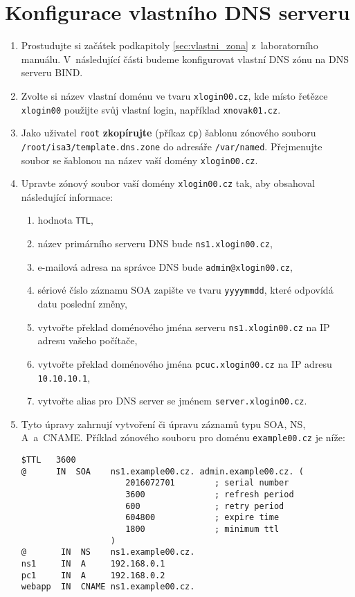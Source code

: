 \documentclass[a4paper,11pt]{article}
\begin{document}
\section{Konfigurace vlastního DNS serveru}
\begin{enumerate}
  \item Prostudujte si začátek podkapitoly \ref{sec:vlastni_zona} z~laboratorního manuálu. V~následující části budeme konfigurovat vlastní DNS zónu na DNS serveru BIND.
  \item Zvolte si název vlastní doménu ve tvaru {\tt xlogin00.cz}, kde místo řetězce {\tt xlogin00} použijte svůj vlastní login, například {\tt xnovak01.cz}.

  \item Jako uživatel {\tt root} \textbf{zkopírujte} (příkaz \texttt{cp}) šablonu zónového souboru {\tt /root/isa3/template.dns.zone} do adresáře {\tt /var/named}. Přejmenujte soubor se šablonou na název vaší domény {\tt xlogin00.cz}.
  \item Upravte zónový soubor vaší domény {\tt xlogin00.cz} tak, aby obsahoval následující informace:
    \begin{enumerate}
      \item hodnota \texttt{TTL},
      \item název primárního serveru DNS bude {\tt ns1.xlogin00.cz},
      \item e-mailová adresa na správce DNS bude {\tt admin@xlogin00.cz},
      \item sériové číslo záznamu SOA zapište ve tvaru {\tt yyyymmdd}, které odpovídá datu poslední změny,
      \item vytvořte překlad doménového jména serveru {\tt ns1.xlogin00.cz} na IP adresu vašeho počítače,
      \item vytvořte překlad doménového jména {\tt pcuc.xlogin00.cz} na IP adresu {\tt 10.10.10.1},
      \item vytvořte alias pro DNS server se jménem {\tt server.xlogin00.cz}.
    \end{enumerate}
  \item Tyto úpravy zahrnují vytvoření či úpravu záznamů typu SOA, NS, A~a~CNAME. Příklad zónového souboru pro doménu {\tt example00.cz} je níže:
\begin{verbatim}
$TTL   3600
@      IN  SOA    ns1.example00.cz. admin.example00.cz. (
                     2016072701        ; serial number
                     3600              ; refresh period
                     600               ; retry period
                     604800            ; expire time
                     1800              ; minimum ttl
                  )
@       IN  NS    ns1.example00.cz.
ns1     IN  A     192.168.0.1
pc1     IN  A     192.168.0.2
webapp  IN  CNAME ns1.example00.cz.
\end{verbatim}


\end{enumerate}
\end{document}
